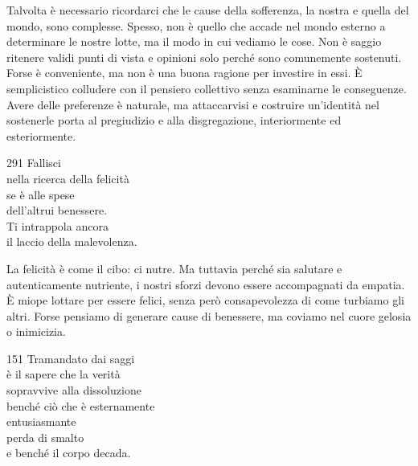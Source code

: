 \begin{dhpRefl}
  Talvolta è necessario ricordarci che le cause della sofferenza, la nostra e
  quella del mondo, sono complesse. Spesso, non è quello che accade nel mondo
  esterno a determinare le nostre lotte, ma il modo in cui vediamo le cose. Non
  è saggio ritenere validi punti di vista e opinioni solo perché sono
  comunemente sostenuti. Forse è conveniente, ma non è una buona ragione per
  investire in essi. È semplicistico colludere con il pensiero collettivo senza
  esaminarne le conseguenze. Avere delle preferenze è naturale, ma attaccarvisi
  e costruire un'identità nel sostenerle porta al pregiudizio e alla
  disgregazione, interiormente ed esteriormente.
\end{dhpRefl}


\begin{dhpVerse}{291}
\label{dhp-291}
Fallisci\\
nella ricerca della felicità\\
se è alle spese\\
dell'altrui benessere.\\
Ti intrappola ancora\\
il laccio della malevolenza.
\end{dhpVerse}

\begin{dhpRefl}
  La felicità è come il cibo: ci nutre. Ma tuttavia perché sia salutare e
  autenticamente nutriente, i nostri sforzi devono essere accompagnati da
  empatia. È miope lottare per essere felici, senza però consapevolezza di come
  turbiamo gli altri. Forse pensiamo di generare cause di benessere, ma coviamo
  nel cuore gelosia o inimicizia.
\end{dhpRefl}


\begin{dhpVerse}{151}
\label{dhp-151}
Tramandato dai saggi\\
è il sapere che la verità\\
sopravvive alla dissoluzione\\
benché ciò che è esternamente\\
entusiasmante\\
perda di smalto\\
e benché il corpo decada.
\end{dhpVerse}

